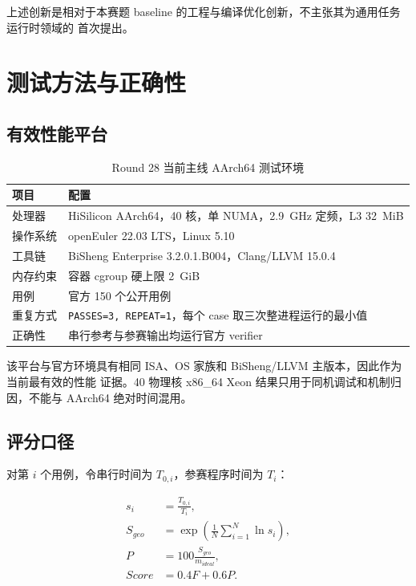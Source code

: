 \documentclass[UTF8,a4paper,openany,11pt,fontset=fandol]{ctexrep}
\begin{document}
上述创新是相对于本赛题 baseline 的工程与编译优化创新，不主张其为通用任务运行时领域的
首次提出。

\chapter{测试方法与正确性}

\section{有效性能平台}

\begin{table}[H]
  \centering
  \caption{Round 28 当前主线 AArch64 测试环境}
  \begin{tabularx}{\textwidth}{L{3.4cm}Y}
    \toprule
    项目 & 配置 \\
    \midrule
    处理器 & HiSilicon AArch64，40 核，单 NUMA，2.9~GHz 定频，L3 32~MiB \\
    操作系统 & openEuler 22.03 LTS，Linux 5.10 \\
    工具链 & BiSheng Enterprise 3.2.0.1.B004，Clang/LLVM 15.0.4 \\
    内存约束 & 容器 cgroup 硬上限 2~GiB \\
    用例 & 官方 150 个公开用例 \\
    重复方式 & \texttt{PASSES=3, REPEAT=1}，每个 case 取三次整进程运行的最小值 \\
    正确性 & 串行参考与参赛输出均运行官方 verifier \\
    \bottomrule
  \end{tabularx}
\end{table}

该平台与官方环境具有相同 ISA、OS 家族和 BiSheng/LLVM 主版本，因此作为当前最有效的性能
证据。40 物理核 x86\_64 Xeon 结果只用于同机调试和机制归因，不能与 AArch64 绝对时间混用。

\section{评分口径}

对第 \(i\) 个用例，令串行时间为 \(T_{0,i}\)，参赛程序时间为 \(T_i\)：

\begin{align*}
  s_i &= \frac{T_{0,i}}{T_i},\\
  S_{geo} &= \exp\!\left(\frac{1}{N}\sum_{i=1}^{N}\ln s_i\right),\\
  P &= 100\frac{S_{geo}}{m_{ideal}},\\
  Score &= 0.4F+0.6P.
\end{align*}
\end{document}
